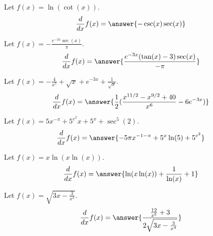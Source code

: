 \documentclass{ximera}
\begin{document}
\begin{shuffle}
\begin{exercise}
Let $f(x)=\ln (\cot (x))$.
\[
\ddx f(x) = \answer{-\csc (x) \sec (x)}
\]
\end{exercise}

\begin{exercise}
Let $f(x)=-\frac{e^{-3 x} \sec (x)}{\pi }$.
\[
\ddx f(x) = \answer{\frac{e^{-3 x} (\tan (x)-3) \sec (x)}{-\pi }}
\]
\end{exercise}

\begin{exercise}
Let $f(x)=-\frac{4}{x^5}+\sqrt{x}+e^{-3 x}+\frac{1}{\sqrt{x}}$.
\[
\ddx f(x) = \answer{\frac{1}{2} (\frac{x^{11/2}-x^{9/2}+40}{x^6}-6 e^{-3 x})}
\]
\end{exercise}


\begin{exercise}
Let $f(x)=5 x^{-\pi }+5^{e^2} x+5^x+\sec ^5(2)$.
\[
\ddx f(x) = \answer{-5 \pi  x^{-1-\pi }+5^x \ln (5)+5^{e^2}}
\]
\end{exercise}



\begin{exercise}
Let $f(x)=x \ln (x \ln (x))$.
\[
\ddx f(x) = \answer{\ln (x \ln (x))+\frac{1}{\ln (x)}+1}
\]
\end{exercise}

\begin{exercise}
Let $f(x)=\sqrt{3 x-\frac{3}{x^4}}$.
\[
\ddx f(x) = \answer{\frac{\frac{12}{x^5}+3}{2 \sqrt{3 x-\frac{3}{x^4}}}}
\]
\end{exercise}


\end{shuffle}
\end{document}
